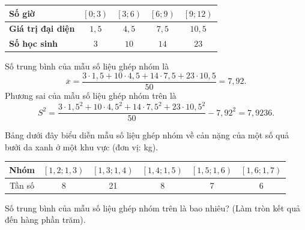 \begin{ex}
{\begin{itemchoice}
			\begin{center}
				\begin{tabular}{|l|c|c|c|c|}
					 \hline
					\textbf{Số giờ}  & $\left[0;3 \right)$&$\left[3;6 \right)$&$\left[6;9 \right)$&$\left[9;12 \right)$ \\
					 \hline
					\textbf{Giá trị đại diện} & $1{,}5$ &  $4{,}5$ & $7{,}5$ & $10{,}5$ \\
					 \hline
					\textbf{Số học sinh} & $3$ & $10$ & $14$ &$23$\\ 
					\hline 
				\end{tabular}
			\end{center}
			Số trung bình của mẫu số liệu ghép nhóm là \[\overline{x}=\dfrac{3\cdot  1{,}5+10\cdot 4{,}5+14\cdot 7{,}5+23\cdot 10{,}5}{50}=7{,}92.\]
			 Phương sai của mẫu số liệu ghép nhóm trên là
			\[S^2=\dfrac{3\cdot  1{,}5^2+10\cdot 4{,}5^2+14\cdot 7{,}5^2+23\cdot 10{,}5^2}{50}-7{,}92^2=7{,}9236.\]
		\end{itemchoice}
	 }
\end{ex}



\begin{bt}%
	Bảng dưới đây biểu diễn mẫu số liệu ghép nhóm về cản nặng của một số quả bưởi da xanh ở một khu vực (đơn vị: kg). 
	\begin{center}
		\begin{tabular}{|c|c|c|c|c|c|}
			 \hline
			Nhóm&$\left[1{,}2;1{,}3\right)$ &$\left[1{,}3;1{,}4\right)$ &$\left[1{,}4;1{,}5\right)$ &  $\left[1{,}5;1{,}6\right)$ & $\left[1{,}6;1{,}7\right)$ \\
			\hline 
			Tần số&8 &21 &  8 & 7 &6 \\
			 \hline
		\end{tabular}
	\end{center}
	Số trung bình của mẫu số liệu ghép nhóm trên là bao nhiêu? (Làm  tròn kết quả đến hàng phần trăm).
\end{bt}

